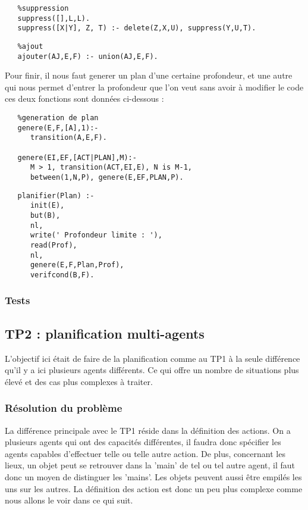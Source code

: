 \documentclass[a4paper,10pt]{article}
\begin{document}
  \begin{lstlisting}
   %suppression
   suppress([],L,L).
   suppress([X|Y], Z, T) :- delete(Z,X,U), suppress(Y,U,T).
  \end{lstlisting}
  \begin{lstlisting}
   %ajout
   ajouter(AJ,E,F) :- union(AJ,E,F).
  \end{lstlisting}
  Pour finir, il nous faut generer un plan d'une certaine profondeur, et une autre qui nous permet d'entrer la profondeur que l'on veut sans avoir
  \`{a} modifier le code ces deux fonctions sont données ci-dessous :
  \begin{lstlisting}
   %generation de plan
   genere(E,F,[A],1):-
      transition(A,E,F).

   genere(EI,EF,[ACT|PLAN],M):-
      M > 1, transition(ACT,EI,E), N is M-1, 
      between(1,N,P), genere(E,EF,PLAN,P).
  \end{lstlisting}
  \begin{lstlisting}
   planifier(Plan) :-
      init(E),
      but(B),
      nl,
      write(' Profondeur limite : '),
      read(Prof),
      nl,
      genere(E,F,Plan,Prof),
      verifcond(B,F).
  \end{lstlisting}
   \subsubsection{Tests}
   
  \subsection{TP2 : planification multi-agents}
 L'objectif ici \'{e}tait de faire de la planification comme au TP1 à la seule différence qu'il y a ici plusieurs agents différents.
 Ce qui offre un nombre de situations plus \'{e}lev\'{e} et des cas plus complexes \`{a} traiter.
 
   \subsubsection{R\'{e}solution du probl\`{e}me}
   La diff\'{e}rence principale avec le TP1 r\'{e}side dans la d\'{e}finition des actions. On a plusieurs agents qui ont des capacit\'{e}s diff\'{e}rentes, il faudra donc
   sp\'{e}cifier les agents capables d'effectuer telle ou telle autre action. De plus, concernant les lieux, un objet peut se retrouver dans la 'main' de tel ou tel autre agent,
   il faut donc un moyen de distinguer les 'mains'. Les objets peuvent aussi \^{e}tre empil\'{e}s les uns sur les autres. La d\'{e}finition des action est donc un peu plus complexe
   comme nous allons le voir dans ce qui suit.
   
\end{document}
